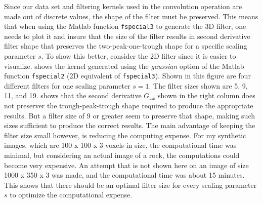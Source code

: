 \documentclass{edger}
\begin{document}
Since our data set and filtering kernels used in the convolution operation are made out of discrete values, the shape of the filter must be preserved. This means that when using the Matlab function \texttt{fspecial3} to generate the 3D filter, one needs to plot it and insure that the size of the filter results in second derivative filter shape that preserves the two-peak-one-trough shape for a specific scaling parameter $s$. To show this better, consider the 2D filter since it is easier to visualize.  shows the kernel generated using the \emph{gaussian} option of the Matlab function \texttt{fspecial2} (2D equivalent of \texttt{fspecial3}). Shown in this figure are four different filters for one scaling parameter $s = 1$. The filter sizes shown are 5, 9, 11, and 19.  shows that the second derivative $G_{xx}$ shown in the right column does not preserver the trough-peak-trough shape required to produce the appropriate results. But a filter size of 9 or greater seem to preserve that shape, making such sizes sufficient to produce the correct results. The main advantage of keeping the filter size small however, is reducing the computing expense. For my synthetic images, which are 100 x 100 x 3 voxels in size, the computational time was minimal, but considering an actual image of a rock, the computations could become very expensive. An attempt that is not shown here on an image of size 1000 x 350 x 3 was made, and the computational time was about 15 minutes. This shows that there should be an optimal filter size for every scaling parameter $s$ to optimize the computational expense. 
\end{document}

